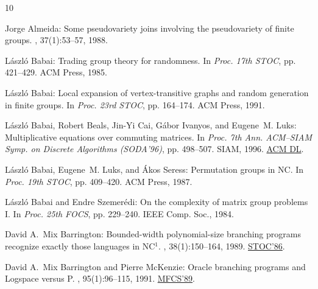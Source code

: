 \documentclass[11pt]{article}
\numberwithin{equation}{section}
\theoremstyle{definition}
\theoremstyle{plain}
\begin{document}
\tocrefpdfbookmark
\begin{thebibliography}{10}

{\sc Jorge Almeida}: Some pseudovariety joins involving the pseudovariety of
  finite groups.
, 37(1):53--57, 1988.
\newblock [\epfmtdoi{10.1007/BF02573123}]

{\sc L\'{a}szl\'{o} Babai}: Trading group theory for randomness.
\newblock In {\em Proc. 17th STOC}, pp. 421--429. ACM Press, 1985.
\newblock [\epfmtdoi{10.1145/22145.22192}]

{\sc L\'{a}szl\'{o} Babai}: Local expansion of vertex-transitive graphs and
  random generation in finite groups.
\newblock In {\em Proc. 23rd STOC}, pp. 164--174. ACM Press, 1991.
\newblock [\epfmtdoi{10.1145/103418.103440}]

{\sc L\'{a}szl\'{o} Babai, Robert Beals, Jin-Yi Cai, G\'{a}bor Ivanyos, and
  Eugene~M. Luks}: Multiplicative equations over commuting matrices.
\newblock In {\em Proc. 7th Ann. ACM--SIAM Symp. on Discrete Algorithms
  (SODA'96)}, pp. 498--507. SIAM, 1996.
\newblock \href{https://dl.acm.org/doi/10.5555/313852.314109}{ACM DL}.

{\sc L{\'{a}}szl{\'{o}} Babai, Eugene~M. Luks, and {\'{A}}kos Seress}:
  Permutation groups in {NC}.
\newblock In {\em Proc. 19th STOC}, pp. 409--420. ACM Press, 1987.
\newblock [\epfmtdoi{10.1145/28395.28439}]

{\sc L\'{a}szl\'{o} Babai and Endre Szemer{\'e}di}: On the complexity of matrix
  group problems {I}.
\newblock In {\em Proc. 25th FOCS}, pp. 229--240. IEEE Comp. Soc., 1984.

{\sc David A.~Mix Barrington}: Bounded-width polynomial-size branching programs
  recognize exactly those languages in {NC}$^1$.
, 38(1):150--164, 1989.
\newblock \prelim \href{https://doi.org/10.1145/12130.12131}{STOC'86}.
\newblock [\epfmtdoi{10.1016/0022-0000(89)90037-8}]

{\sc David A.~Mix Barrington and Pierre McKenzie}: Oracle branching programs
  and {Logspace} versus {P}.
, 95(1):96--115, 1991.
\newblock \prelim \href{https://doi.org/10.1007/3-540-51486-4\_84}{MFCS'89}.
\newblock [\epfmtdoi{10.1016/0890-5401(91)90017-V}]


\end{thebibliography}
\end{document}
